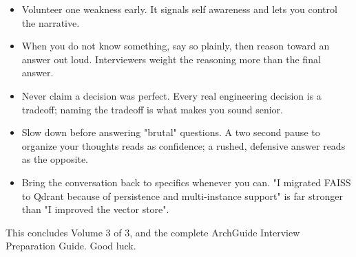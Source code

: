\documentclass[11pt,a4paper]{report}
\begin{document}
\begin{notebox}
\begin{itemize}[leftmargin=*]
\item Volunteer one weakness early. It signals self awareness and lets you control the narrative.
\item When you do not know something, say so plainly, then reason toward an answer out loud. Interviewers weight the reasoning more than the final answer.
\item Never claim a decision was perfect. Every real engineering decision is a tradeoff; naming the tradeoff is what makes you sound senior.
\item Slow down before answering "brutal" questions. A two second pause to organize your thoughts reads as confidence; a rushed, defensive answer reads as the opposite.
\item Bring the conversation back to specifics whenever you can. "I migrated FAISS to Qdrant because of persistence and multi-instance support" is far stronger than "I improved the vector store".
\end{itemize}
\end{notebox}

This concludes Volume 3 of 3, and the complete ArchGuide Interview Preparation Guide. Good luck.
\end{document}
